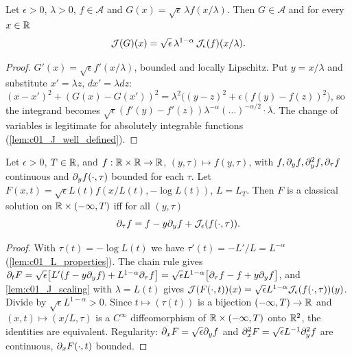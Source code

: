 \begin{lemma}[Scaling of $\mc J$]
  \label{lem:c01_J_scaling}
  Let $\epsilon>0$, $\lambda>0$, $f\in\mathcal A$ and $G(x)=\sqrt\epsilon\,\lambda f(x/\lambda)$.
  Then $G\in\mathcal A$ and for every $x\in\mathbb{R}$
  \[
    \mathcal{J}(G)(x)=\sqrt\epsilon\,\lambda^{1-\alpha}\,\mathcal{J}_\epsilon(f)(x/\lambda).
  \]
\end{lemma}
\begin{proof}
  $G'(x)=\sqrt\epsilon f'(x/\lambda)$, bounded and locally Lipschitz.  Put $y=x/\lambda$ and
  substitute $x'=\lambda z$, $dx'=\lambda dz$:
  $(x-x')^2+(G(x)-G(x'))^2=\lambda^2\bigl((y-z)^2+\epsilon(f(y)-f(z))^2\bigr)$, so the integrand
  becomes $\sqrt\epsilon(f'(y)-f'(z))\lambda^{-\alpha}(\dots)^{-\alpha/2}\cdot\lambda$.  The change of
  variables is legitimate for absolutely integrable functions (\cref{lem:c01_J_well_defined}).
\end{proof}

\begin{lemma}
  \label{lem:c01_self_similar_evolution}
  Let $\epsilon>0$, $T\in\mathbb{R}$, and $f:\mathbb{R}\times\mathbb{R}\to\mathbb{R}$, $(y,\tau)\mapsto f(y,\tau)$, with
  $f,\partial_yf,\partial_y^2f,\partial_\tau f$ continuous and $\partial_yf(\cdot,\tau)$ bounded for each $\tau$.  Let
  $F(x,t)=\sqrt\epsilon L(t)f(x/L(t),-\log L(t))$, $L=L_T$.  Then $F$ is a classical solution on
  $\mathbb{R}\times(-\infty,T)$ iff for all $(y,\tau)$
  \begin{equation}\label{eqn:self_similar_front_equation_scaled}
    \partial_\tau f=f-y\partial_yf+\mathcal{J}_\epsilon(f(\cdot,\tau)).
  \end{equation}
\end{lemma}
\begin{proof}
  With $\tau(t)=-\log L(t)$ we have $\tau'(t)=-L'/L=L^{-\alpha}$ (\cref{lem:c01_L_properties}).
  The chain rule gives
  $\partial_tF=\sqrt\epsilon\bigl[L'(f-y\partial_yf)+L^{1-\alpha}\partial_\tau f\bigr]
  =\sqrt\epsilon L^{1-\alpha}\bigl[\partial_\tau f-f+y\partial_yf\bigr]$, and \cref{lem:c01_J_scaling} with
  $\lambda=L(t)$ gives $\mathcal{J}(F(\cdot,t))(x)=\sqrt\epsilon L^{1-\alpha}\mathcal{J}_\epsilon(f(\cdot,\tau))(y)$.
  Divide by $\sqrt\epsilon L^{1-\alpha}>0$.  Since $t\mapsto(\tau(t))$ is a bijection
  $(-\infty,T)\to\mathbb{R}$ and $(x,t)\mapsto(x/L,\tau)$ is a $C^\infty$ diffeomorphism of
  $\mathbb{R}\times(-\infty,T)$ onto $\mathbb{R}^2$, the identities are equivalent.  Regularity:
  $\partial_xF=\sqrt\epsilon\partial_yf$ and $\partial_x^2F=\sqrt\epsilon L^{-1}\partial_y^2f$ are continuous, $\partial_xF(\cdot,t)$
  bounded.
\end{proof}

